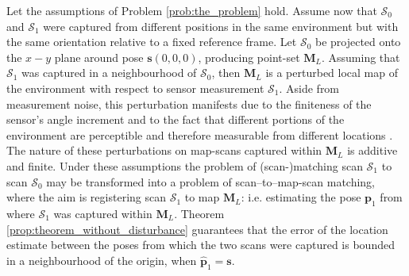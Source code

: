 Let the assumptions of Problem \ref{prob:the_problem} hold. Assume now
that $\mathcal{S}_0$ and $\mathcal{S}_1$ were captured from different
positions in the same environment but with the same orientation
relative to a fixed reference frame. Let $\mathcal{S}_0$ be projected onto
the $x-y$ plane around pose $\bm{s}(0,0,0)$,
producing point-set $\bm{M}_L$. Assuming that $\mathcal{S}_1$ was captured in a
neighbourhood of $\mathcal{S}_0$, then $\bm{M}_L$ is a perturbed local map of
the environment with respect to sensor measurement $\mathcal{S}_1$. Aside from
measurement noise, this perturbation manifests due to the finiteness of the
sensor's angle increment and to the fact that different portions of the
environment are perceptible and therefore measurable from different locations
\cite{Olson2009}. The nature of these perturbations on map-scans captured within
$\bm{M}_L$ is additive and finite. Under these assumptions the problem of
(scan-)matching scan $\mathcal{S}_1$ to scan $\mathcal{S}_0$ may be transformed
into a problem of scan--to--map-scan matching, where the aim is registering
scan $\mathcal{S}_1$ to map $\bm{M}_L$: i.e. estimating the pose $\bm{p}_1$
from where $\mathcal{S}_1$ was captured within $\bm{M}_L$. Theorem
\ref{prop:theorem_without_disturbance} \cite{Filotheou2022} guarantees that the
error of the location estimate between the poses from which the two scans were
captured is bounded in a neighbourhood of the origin, when $\hat{\bm{p}}_1 =
\bm{s}$.


